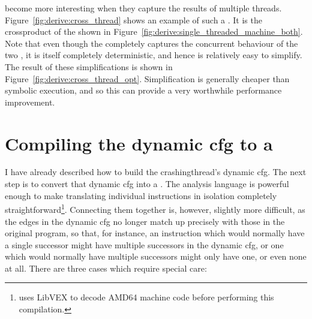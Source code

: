 {\STateMachines} become more interesting when they capture the results
of multiple threads.  Figure~\ref{fig:derive:cross_thread} shows an
example of such a {\StateMachine}.  It is the \gls{crossproduct} of
the {\StateMachines} shown in
Figure~\ref{fig:derive:single_threaded_machine_both}.  Note that even
though the {\StateMachine} completely captures the concurrent
behaviour of the two {\StateMachines}, it is itself completely
deterministic, and hence is relatively easy to simplify.  The result
of these simplifications is shown in
Figure~\ref{fig:derive:cross_thread_opt}.  Simplification is generally
cheaper than symbolic execution, and so this can provide a very
worthwhile performance improvement.

\section[Compiling the dynamic \glsentrytext{cfg} to a \StateMachine]{Compiling the dynamic \gls{cfg} to a \StateMachine}
\label{sect:derive:compile_cfg}

I have already described how to build the \gls{crashingthread}'s
dynamic \gls{cfg}.  The next step is to convert that dynamic \gls{cfg}
into a {\StateMachine}.  The {\StateMachine} analysis language is
powerful enough to make translating individual instructions in
isolation completely straightforward\footnote{{\Implementation} uses
  LibVEX  to decode AMD64 machine code before performing
  this compilation.}.  Connecting them together is, however, slightly
more difficult, as the edges in the dynamic \gls{cfg} no longer match
up precisely with those in the original program, so that, for
instance, an instruction which would normally have a single successor
might have multiple successors in the dynamic \gls{cfg}, or one which
would normally have multiple successors might only have one, or even
none at all.  There are three cases which require special care:

